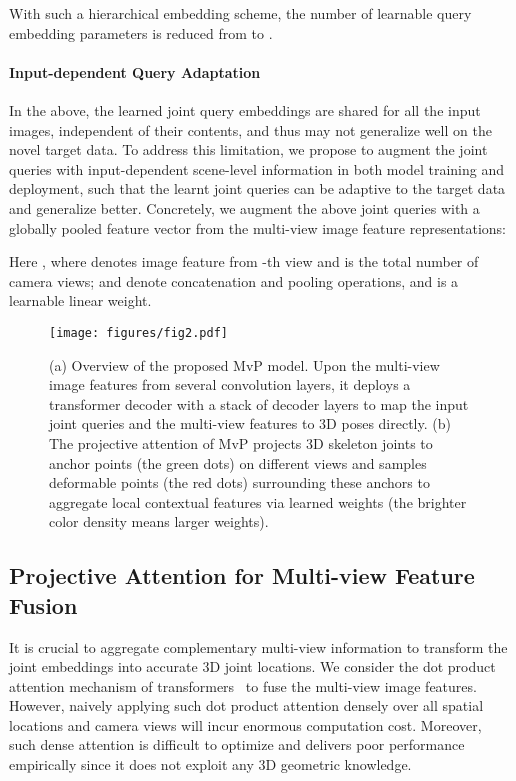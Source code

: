 \documentclass{article}
\begin{document}
With such a hierarchical embedding scheme, the number of learnable query embedding parameters is reduced from  to . 


\paragraph{Input-dependent Query Adaptation}
In the above, the learned joint query embeddings are shared for all the input images, independent of their   contents, and thus may not generalize well on the novel target data. 
{To address this limitation, we propose to augment the joint queries with input-dependent scene-level information in both model training and deployment, such that the learnt joint queries can be adaptive to the target data and generalize better.}
Concretely, we augment the above joint queries with a globally pooled feature vector  from the multi-view image feature representations:

Here , where  denotes image feature from -th view and  is the total number of camera views;  and  denote concatenation and pooling operations, and  is a learnable linear weight. 

\begin{figure}[t]
	\centering
	\texttt{[image: figures/fig2.pdf]}
	\caption{
	(a)  Overview of the proposed MvP model. 
	Upon the multi-view image features from several convolution layers, it deploys  a transformer decoder with a stack of decoder layers to map the input joint queries and the multi-view features to 3D poses directly.
	(b) The projective attention of MvP projects 3D skeleton joints to anchor points (the green dots) on different views and samples deformable points (the red dots) surrounding these anchors  to aggregate local contextual features via learned   weights (the brighter color density means larger weights).
	}
	\label{fig:overview_and_pattn}
\end{figure}

\subsection{Projective Attention for Multi-view Feature Fusion}
\label{sec:projective_attn}
It is crucial to aggregate complementary multi-view information to transform the joint embeddings into accurate 3D joint locations.
We consider  the    dot product attention mechanism of transformers~\cite{vaswani2017attention} to fuse the multi-view image features. 
However, naively applying  such dot product attention densely over all spatial locations and camera views will incur enormous computation cost. 
Moreover, such dense attention is difficult to optimize and delivers poor performance empirically since it does not exploit any 3D geometric knowledge.
\end{document}
